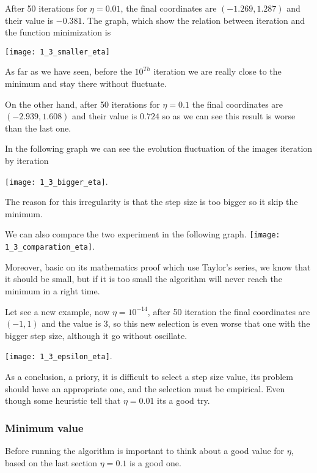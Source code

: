   After 50 iterations for  $\eta = 0.01$, the  final coordinates are $(-1.269, 1.287)$ and their value is $-0.381$. The graph, which show the relation between iteration and the function minimization is

  \texttt{[image: 1\_3\_smaller\_eta]}

  As far as we have seen, before the $10^{Th}$ iteration we are really close to  the minimum and stay there without fluctuate.

  On the other hand, after 50 iterations for  $\eta = 0.1$ the final coordinates are $(-2.939, 1.608)$ and their value is $0.724$ so as we can see this result is worse than the last one.

  In the following graph we can see the evolution fluctuation of the images iteration by iteration 

  \texttt{[image: 1\_3\_bigger\_eta]}.

 The reason for this irregularity  is that the step size is too bigger so it skip the minimum.

  We can also  compare the two experiment in the following graph.
  \texttt{[image: 1\_3\_comparation\_eta]}.


    Moreover, basic on its mathematics proof which use Taylor's series, we know that it should be small, but if it is too small the algorithm will never reach the minimum in a right time.

 Let see a new example, now $\eta = 10^{-14}$, after 50 iteration  the final coordinates are $(-1, 1)$  and the value is $3$, so this new selection is even worse that one with the bigger step size, although it go without oscillate.  

 \texttt{[image: 1\_3\_epsilon\_eta]}.
 
    
  As a conclusion, a priory, it is difficult to select a step size value, its problem should have an appropriate one, and the selection must be empirical. Even though some heuristic \cite{LFD} tell that $\eta = 0.01$ its a good try.  


  

\subsubsection{Minimum value }


Before running the algorithm is important to think about a good value for $\eta$, based on the last section $\eta = 0.1$ is a good one. 



